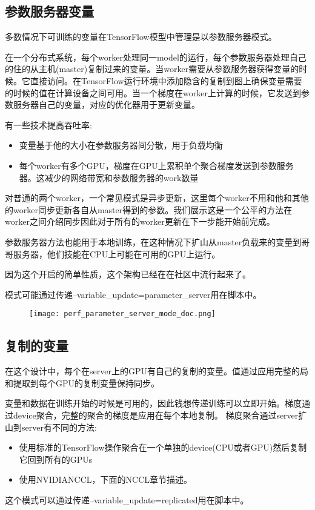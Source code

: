 \subsection{参数服务器变量}
多数情况下可训练的变量在TensorFlow模型中管理是以参数服务器模式。

在一个分布式系统，每个worker处理同一model的运行，每个参数服务器处理自己的住的从主机(master)复制过来的变量。当worker需要从参数服务器获得变量的时候。它直接访问。在TensorFlow运行环境中添加隐含的复制到图上确保变量需要的时候的值在计算设备之间可用。当一个梯度在worker上计算的时候，它发送到参数服务器自己的变量，对应的优化器用于更新变量。

有一些技术提高吞吐率:
\begin{itemize}
    \item 变量基于他的大小在参数服务器间分散，用于负载均衡
    \item 每个worker有多个GPU，梯度在GPU上累积单个聚合梯度发送到参数服务器。这减少的网络带宽和参数服务器的work数量
\end{itemize}
对普通的两个worker，一个常见模式是异步更新，这里每个worker不用和他和其他的worker同步更新各自从master得到的参数。我们展示这是一个公平的方法在worker之间介绍同步因此对于所有的worker更新在下一步能开始前完成。

参数服务器方法也能用于本地训练，在这种情况下扩山从master负载来的变量到哥哥服务器，他们技能在CPU上可能在可用的GPU上运行。

因为这个开启的简单性质，这个架构已经在在社区中流行起来了。

模式可能通过传递--variable\_update=parameter\_server用在脚本中。
\begin{figure}
	\centering
	\texttt{[image: perf\_parameter\_server\_mode\_doc.png]}
\end{figure}
\subsection{复制的变量}
在这个设计中，每个在server上的GPU有自己的复制的变量。值通过应用完整的局和提取到每个GPU的复制变量保持同步。

变量和数据在训练开始的时候是可用的，因此钱想传递训练可以立即开始。梯度通过device聚合，完整的聚合的梯度是应用在每个本地复制。
梯度聚合通过server扩山到server有不同的方法:
\begin{itemize}
	\item 使用标准的TensorFlow操作聚合在一个单独的device(CPU或者GPU)然后复制它回到所有的GPUs
	\item 使用NVIDIANCCL，下面的NCCL章节描述。
\end{itemize}
这个模式可以通过传递--variable\_update=replicated用在脚本中。
